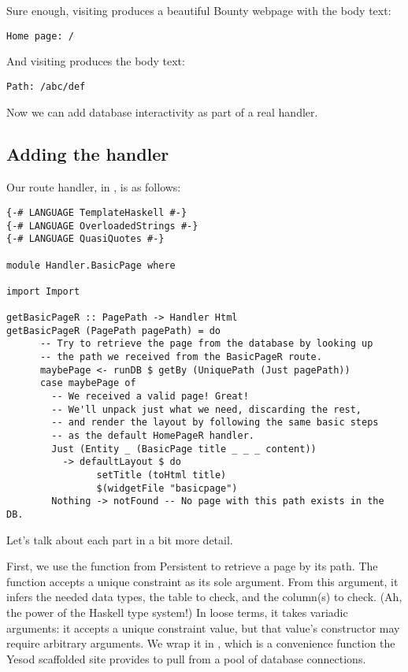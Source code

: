 Sure enough, visiting  produces a beautiful Bounty webpage with the body text:

\begin{Verbatim}
Home page: /
\end{Verbatim}

And visiting  produces the body text:

\begin{Verbatim}
Path: /abc/def
\end{Verbatim}

Now we can add database interactivity as part of a real handler.

\subsection{Adding the handler}

Our route handler, in , is as follows:

\begin{Verbatim}
{-# LANGUAGE TemplateHaskell #-}
{-# LANGUAGE OverloadedStrings #-}
{-# LANGUAGE QuasiQuotes #-}

module Handler.BasicPage where

import Import

getBasicPageR :: PagePath -> Handler Html
getBasicPageR (PagePath pagePath) = do
      -- Try to retrieve the page from the database by looking up
      -- the path we received from the BasicPageR route.
      maybePage <- runDB $ getBy (UniquePath (Just pagePath))
      case maybePage of
        -- We received a valid page! Great!
        -- We'll unpack just what we need, discarding the rest,
        -- and render the layout by following the same basic steps
        -- as the default HomePageR handler.
        Just (Entity _ (BasicPage title _ _ _ content)) 
          -> defaultLayout $ do
                setTitle (toHtml title)
                $(widgetFile "basicpage")
        Nothing -> notFound -- No page with this path exists in the DB.
\end{Verbatim}

Let's talk about each part in a bit more detail.

First, we use the  function from Persistent to retrieve a page by its path. The  function accepts a unique constraint as its sole argument. From this argument, it infers the needed data types, the table to check, and the column(s) to check. (Ah, the power of the Haskell type system!) In loose terms, it takes variadic arguments: it accepts a unique constraint value, but that value's constructor may require arbitrary arguments. We wrap it in , which is a convenience function the Yesod scaffolded site provides to pull from a pool of database connections.

